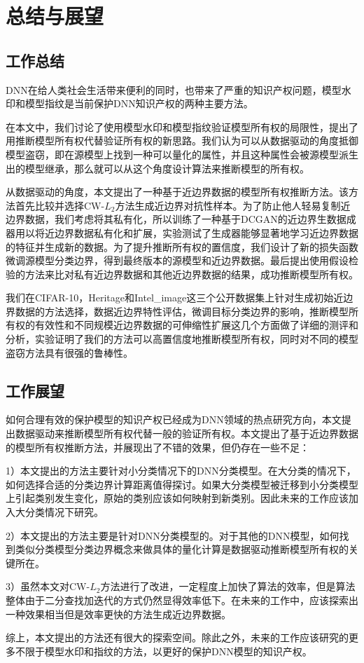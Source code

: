 \chapter{总结与展望}\label{6}


\section{工作总结}

DNN在给人类社会生活带来便利的同时，也带来了严重的知识产权问题，模型水印和模型指纹是当前保护DNN知识产权的两种主要方法。

在本文中，我们讨论了使用模型水印和模型指纹验证模型所有权的局限性，提出了用推断模型所有权代替验证所有权的新思路。我们认为可以从数据驱动的角度抵御模型盗窃，即在源模型上找到一种可以量化的属性，并且这种属性会被源模型派生出的模型继承，那么就可以从这个角度设计算法来推断模型的所有权。

从数据驱动的角度，本文提出了一种基于近边界数据的模型所有权推断方法。该方法首先比较并选择CW-$L_2$方法生成近边界对抗性样本。为了防止他人轻易复制近边界数据，我们考虑将其私有化，所以训练了一种基于DCGAN的近边界生数据成器用以将近边界数据私有化和扩展，实验测试了生成器能够显著地学习近边界数据的特征并生成新的数据。为了提升推断所有权的置信度，我们设计了新的损失函数微调源模型分类边界，得到最终版本的源模型和近边界数据。最后提出使用假设检验的方法来比对私有近边界数据和其他近边界数据的结果，成功推断模型所有权。

我们在CIFAR-10，Heritage和Intel\_image这三个公开数据集上针对生成初始近边界数据的方法选择，数据近边界特性评估，微调目标分类边界的影响，推断模型所有权的有效性和不同规模近边界数据的可伸缩性扩展这几个方面做了详细的测评和分析，实验证明了我们的方法可以高置信度地推断模型所有权，同时对不同的模型盗窃方法具有很强的鲁棒性。



\section{工作展望}

如何合理有效的保护模型的知识产权已经成为DNN领域的热点研究方向，本文提出数据驱动来推断模型所有权代替一般的验证所有权。本文提出了基于近边界数据的模型所有权推断方法，并展现出了不错的效果，但仍存在一些不足：

1）本文提出的方法主要针对小分类情况下的DNN分类模型。在大分类的情况下，如何选择合适的分类边界计算距离值得探讨。如果大分类模型被迁移到小分类模型上引起类别发生变化，原始的类别应该如何映射到新类别。因此未来的工作应该加入大分类情况下研究。

2）本文提出的方法主要是针对DNN分类模型的。对于其他的DNN模型，如何找到类似分类模型分类边界概念来做具体的量化计算是数据驱动推断模型所有权的关键所在。

3）虽然本文对CW-$L_2$方法进行了改进，一定程度上加快了算法的效率，但是算法整体由于二分查找加迭代的方式仍然显得效率低下。在未来的工作中，应该探索出一种效果相当但是效率更快的方法生成近边界数据。

综上，本文提出的方法还有很大的探索空间。除此之外，未来的工作应该研究的更多不限于模型水印和指纹的方法，以更好的保护DNN模型的知识产权。





